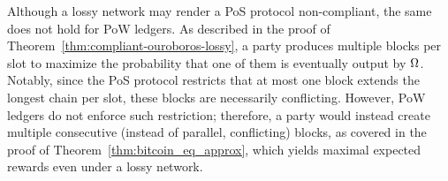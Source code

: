 \begin{remark*}
Although a lossy network may render a PoS protocol
non-compliant, the same does not hold for PoW ledgers. As described in the
proof of Theorem~\ref{thm:compliant-ouroboros-lossy}, a party produces multiple
blocks per slot to maximize the probability that one of them is eventually
output by $\Omega$. Notably, since the PoS protocol restricts that at most
one block extends the longest chain per slot, these blocks are necessarily
conflicting. However, PoW ledgers do not enforce such restriction; therefore, a
party would instead create multiple consecutive (instead of parallel,
conflicting) blocks, as covered in the proof of
Theorem~\ref{thm:bitcoin_eq_approx}, which yields maximal expected rewards even
under a lossy network.
\end{remark*}

